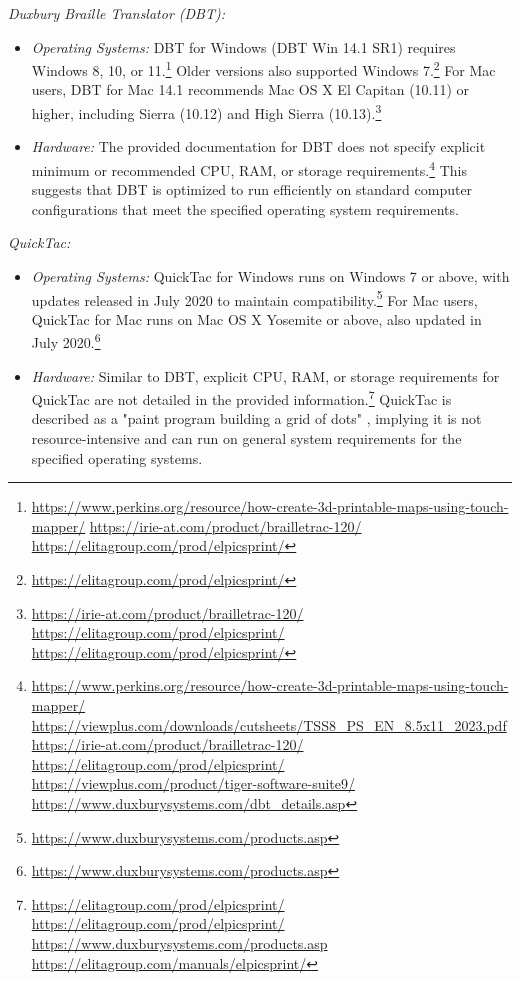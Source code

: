 \emph{Duxbury Braille Translator (DBT):}
\begin{itemize}
    \item \emph{Operating Systems:} DBT for Windows (DBT Win 14.1 SR1) requires Windows 8, 10, or 11.\footnote{\url{https://www.perkins.org/resource/how-create-3d-printable-maps-using-touch-mapper/} \url{https://irie-at.com/product/brailletrac-120/} \url{https://elitagroup.com/prod/elpicsprint/}} Older versions also supported Windows 7.\footnote{\url{https://elitagroup.com/prod/elpicsprint/}} For Mac users, DBT for Mac 14.1 recommends Mac OS X El Capitan (10.11) or higher, including Sierra (10.12) and High Sierra (10.13).\footnote{\url{https://irie-at.com/product/brailletrac-120/} \url{https://elitagroup.com/prod/elpicsprint/} \url{https://elitagroup.com/prod/elpicsprint/}}
    \item \emph{Hardware:} The provided documentation for DBT does not specify explicit minimum or recommended CPU, RAM, or storage requirements.\footnote{\url{https://www.perkins.org/resource/how-create-3d-printable-maps-using-touch-mapper/} \url{https://viewplus.com/downloads/cutsheets/TSS8_PS_EN_8.5x11_2023.pdf} \url{https://irie-at.com/product/brailletrac-120/} \url{https://elitagroup.com/prod/elpicsprint/} \url{https://viewplus.com/product/tiger-software-suite9/} \url{https://www.duxburysystems.com/dbt_details.asp}} This suggests that DBT is optimized to run efficiently on standard computer configurations that meet the specified operating system requirements.
\end{itemize}

\emph{QuickTac:}
\begin{itemize}
    \item \emph{Operating Systems:} QuickTac for Windows runs on Windows 7 or above, with updates released in July 2020 to maintain compatibility.\footnote{\url{https://www.duxburysystems.com/products.asp}} For Mac users, QuickTac for Mac runs on Mac OS X Yosemite or above, also updated in July 2020.\footnote{\url{https://www.duxburysystems.com/products.asp}}
    \item \emph{Hardware:} Similar to DBT, explicit CPU, RAM, or storage requirements for QuickTac are not detailed in the provided information.\footnote{\url{https://elitagroup.com/prod/elpicsprint/} \url{https://elitagroup.com/prod/elpicsprint/} \url{https://www.duxburysystems.com/products.asp} \url{https://elitagroup.com/manuals/elpicsprint/}} QuickTac is described as a "paint program building a grid of dots" \cite{}, implying it is not resource-intensive and can run on general system requirements for the specified operating systems.
\end{itemize}


